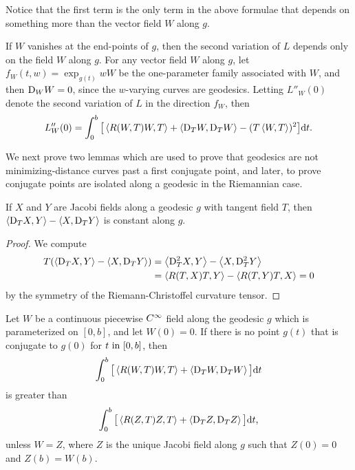 \documentclass[../main]{subfiles}
\begin{document}
Notice that the first term is the only term in the above formulae that depends on something more than the vector field $W$ along $g$.



\begin{corollary} \label{cor:ch10.2.7}
    If $W$ vanishes at the end-points of $g$, then the second variation of $L$ depends only on the field $W$ along $g$. For any vector field $W$ along $g$, let $f_W(t, w) = \exp_{g(t)}wW$ be the  one-parameter family associated with $W$, and then $\mathrm{D}_W W = 0$, since the $w$-varying curves are geodesics. Letting $L''_W(0)$ denote the second variation of $L$ in the direction $f_W$, then
    \[ L''_W(0) = \int_0^b \big[\left\langle R(W, T)W,T\right\rangle + \left\langle\mathrm{D}_T W,\mathrm{D}_T W\right\rangle - (T\left\langle W,T\right\rangle)^2\big] \mathrm{d}t\text{.} \]
\end{corollary}



We next prove two lemmas which are used to prove that geodesics are not minimizing-distance curves past a first conjugate point, and later, to prove conjugate points are isolated along a geodesic in the Riemannian case.



\begin{lemma} \label{lem:ch10.2.8}
    If $X$ and $Y$ are Jacobi fields along a geodesic $g$ with tangent field $T$, then $\left\langle\mathrm{D}_T X,Y\right\rangle - \left\langle X,\mathrm{D}_T Y\right\rangle$ is constant along $g$.
\end{lemma}

\begin{proof}
    We compute
    \begin{align*}
        T(\left\langle\mathrm{D}_T X,Y\right\rangle - \left\langle X,\mathrm{D}_T Y\right\rangle) &= \left\langle\mathrm{D}_T^2 X,Y\right\rangle - \left\langle X,\mathrm{D}_T^2 Y\right\rangle \\
        &= \left\langle R(T, X)T,Y\right\rangle - \left\langle R(T, Y)T,X\right\rangle = 0
    \end{align*}%
    by the symmetry of the Riemann-Christoffel curvature tensor.
\end{proof}



\begin{lemma} \label{lem:ch10.2.9}
    Let $W$ be a continuous piecewise $C^\infty$ field along the geodesic $g$ which is parameterized on $[0,b]$, and let $W(0) = 0$. If there is no point $g(t)$ that is conjugate to $g(0)$ for $t \text{ in } [0,b]$, then
    \[ \int_0^b \big[\left\langle R(W,T)W,T\right\rangle + \left\langle\mathrm{D}_T W,\mathrm{D}_T W\right\rangle\big] \mathrm{d}t \]
    is greater than
    \[ \int_0^b \big[\left\langle R(Z, T)Z,T\right\rangle + \left\langle\mathrm{D}_T Z,\mathrm{D}_T Z\right\rangle\big] \mathrm{d}t\text{,} \]
    unless $W = Z$, where $Z$ is the unique Jacobi field along $g$ such that $Z(0) = 0$ and $Z(b) = W(b)$.
\end{lemma}
\end{document}
